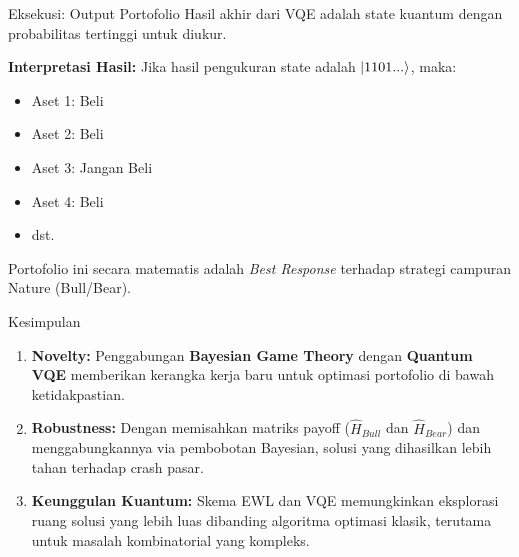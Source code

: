 \documentclass{beamer}
\begin{document}
\begin{frame}{Eksekusi: Output Portofolio}
    Hasil akhir dari VQE adalah state kuantum dengan probabilitas tertinggi untuk diukur.
    
    \textbf{Interpretasi Hasil:}
    Jika hasil pengukuran state adalah $\ket{1101...}$, maka:
    \begin{itemize}
        \item Aset 1: Beli
        \item Aset 2: Beli
        \item Aset 3: Jangan Beli
        \item Aset 4: Beli
        \item dst.
    \end{itemize}
    
    Portofolio ini secara matematis adalah \textit{Best Response} terhadap strategi campuran Nature (Bull/Bear).
\end{frame}



\begin{frame}{Kesimpulan}
    \begin{enumerate}
        \item \textbf{Novelty:} Penggabungan \textbf{Bayesian Game Theory} dengan \textbf{Quantum VQE} memberikan kerangka kerja baru untuk optimasi portofolio di bawah ketidakpastian.
        
        \item \textbf{Robustness:} Dengan memisahkan matriks payoff ($\hat{H}_{Bull}$ dan $\hat{H}_{Bear}$) dan menggabungkannya via pembobotan Bayesian, solusi yang dihasilkan lebih tahan terhadap crash pasar.
        
        \item \textbf{Keunggulan Kuantum:} Skema EWL dan VQE memungkinkan eksplorasi ruang solusi yang lebih luas dibanding algoritma optimasi klasik, terutama untuk masalah kombinatorial yang kompleks.
    \end{enumerate}
\end{frame}
\end{document}
